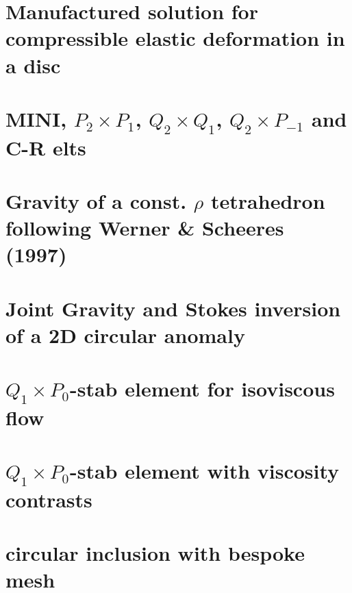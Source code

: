 \documentclass[a4paper,11pt]{report}
\begin{document}
\chapter{Manufactured solution for compressible elastic deformation in a disc\label{f111}}

\chapter{MINI, $P_2\times P_1$,  $Q_2\times Q_1$, $Q_2\times P_{-1}$ and C-R elts\label{f112}}

\chapter{Gravity of a const. $\rho$ tetrahedron following Werner \& Scheeres (1997) \label{f113}}

\chapter{Joint Gravity and Stokes inversion of a 2D circular anomaly \label{f114}}

\chapter{$Q_1\times P_0$-stab element for isoviscous flow \label{f115}}

\chapter{$Q_1\times P_0$-stab element with viscosity contrasts\label{f116}}

\chapter{circular inclusion with bespoke mesh \label{f117}}
\end{document}
